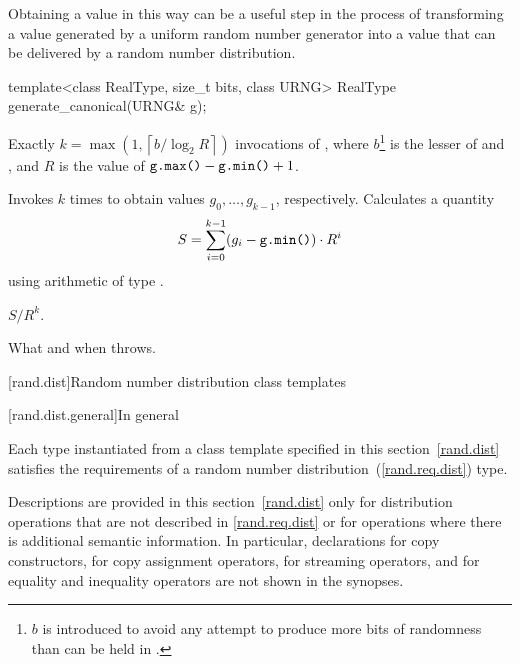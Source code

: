 \pnum
\enternote
 Obtaining a value in this way
 can be a useful step
 in the process of transforming
 a value generated by a uniform random number generator
 into a value
 that can be delivered by a random number distribution.
\exitnote

%
\begin{itemdecl}
template<class RealType, size_t bits, class URNG>
 RealType generate_canonical(URNG& g);
\end{itemdecl}

\begin{itemdescr}
\pnum\complexity Exactly
 $ k = \max(1, \left\lceil b / \log_2 R \right\rceil)$
 invocations
 of ,
 where $b$\footnote{$b$ is introduced
   to avoid any attempt
   to produce more bits of randomness
   than can be held in .}
   is the lesser of 
                and ,
 and
   $R$ is the value of $ \texttt{g.max()} - \texttt{g.min()} + 1 $.

\pnum\effects
 Invokes  $k$ times
 to obtain values $ g_0, \ldots, g_{k-1} $, respectively.
 Calculates a quantity
 \[
   S = \sum_{i=0}^{k-1} (g_i - \texttt{g.min()})
                        \cdot R^i
 \]
 using arithmetic of type
 .

\pnum\returns
 $ S / R^k $.

\pnum\throws What and when  throws.
\end{itemdescr}%




[rand.dist]{Random number distribution class templates}%

[rand.dist.general]{In general}

\pnum
Each type instantiated
from a class template specified in this section~\ref{rand.dist}
satisfies the requirements
of a random number distribution~(\ref{rand.req.dist}) type.

\pnum
Descriptions are provided in this section~\ref{rand.dist}
only for distribution operations
that are not described in \ref{rand.req.dist}
or for operations where there is additional semantic information.
In particular,
declarations for copy constructors,
for copy assignment operators,
for streaming operators,
and for equality and inequality operators
are not shown in the synopses.

